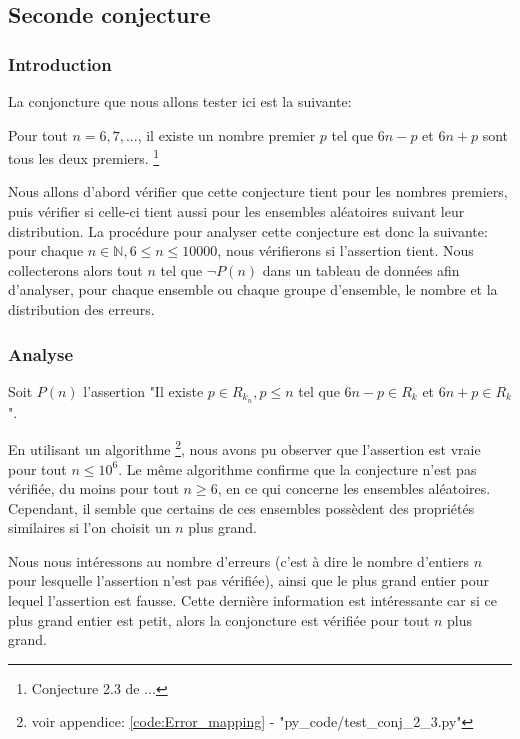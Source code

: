 \documentclass[../main.text]{report}
\begin{document}
\subsection{Seconde conjecture}
\subsubsection{Introduction}

La conjoncture que nous allons tester ici est la suivante: 

	\begin{Conj}
	Pour tout $n = 6, 7, ...$, il existe un nombre premier $p$ tel que $6n-p$ et $6n+p$ sont tous les deux premiers. \footnote{Conjecture 2.3 de ...}
	\end{Conj}
	

Nous allons d'abord vérifier que cette conjecture tient pour les nombres premiers, puis vérifier si celle-ci tient aussi pour les ensembles aléatoires suivant leur distribution.
La procédure pour analyser cette conjecture est donc la suivante: pour chaque $n\in \mathbb{N}, 6 \leq n \leq 10000$, nous vérifierons si l'assertion tient. Nous collecterons alors tout $n$ tel que $\neg P(n)$ dans un tableau de données afin d'analyser, pour chaque ensemble ou chaque groupe d'ensemble, le nombre et la distribution des erreurs.

\subsubsection{Analyse}


Soit $P(n)$ l'assertion "Il existe $p \in R_{k_n}, p \leq n$ tel que $6n-p \in R_k$ et $6n+p \in R_k$".

En utilisant un algorithme \footnote{voir appendice: \ref{code:Error_mapping} - "py\_code/test\_conj\_2\_3.py" }, nous avons pu observer que l'assertion est vraie pour tout $n \leq 10^6$.
Le même algorithme confirme que la conjecture n'est pas vérifiée, du moins pour tout $n \geq 6$, en ce qui concerne les ensembles aléatoires. Cependant, il semble que certains de ces ensembles possèdent des propriétés similaires si l'on choisit un $n$ plus grand.

Nous nous intéressons au nombre d'erreurs (c'est à dire le nombre d'entiers $n$ pour lesquelle l'assertion n'est pas vérifiée), ainsi que le plus grand entier pour lequel l'assertion est fausse. Cette dernière information est intéressante car si ce plus grand entier est petit, alors la conjoncture est vérifiée pour tout $n$ plus grand.
\end{document}
